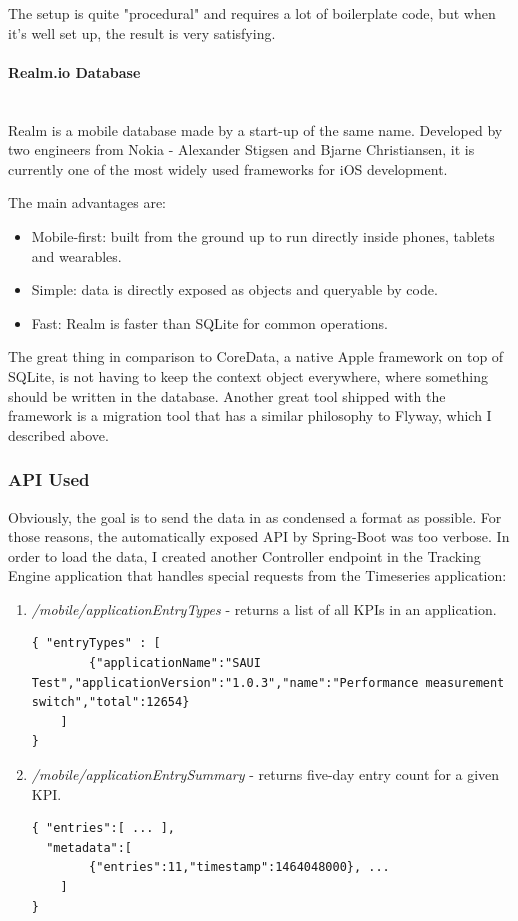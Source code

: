 The setup is quite "procedural" and requires a lot of boilerplate code, but when it's well set up, the result is very satisfying.

\newpage

\paragraph{Realm.io Database}\mbox{}\\

Realm is a mobile database made by a start-up of the same name. Developed by two engineers from Nokia - Alexander Stigsen and Bjarne Christiansen, it is currently one of the most widely used frameworks for iOS development. 

The main advantages are:

\begin{itemize}
	\item Mobile-first: built from the ground up to run directly inside phones, tablets and wearables.
	\item Simple: data is directly exposed as objects and queryable by code.
	\item Fast: Realm is faster than SQLite for common operations.
\end{itemize}

The great thing in comparison to CoreData, a native Apple framework on top of SQLite, is not having to keep the context object everywhere, where something should be written in the database. Another great tool shipped with the framework is a migration tool that has a similar philosophy to Flyway, which I described above.

\subsubsection{API Used}

Obviously, the goal is to send the data in as condensed a format as possible. For those reasons, the automatically exposed API by Spring-Boot was too verbose. In order to load the data, I created another Controller endpoint in the Tracking Engine application that handles special requests from the Timeseries application:

\begin{enumerate}
	\item \emph{/mobile/applicationEntryTypes} - returns a list of all KPIs in an application.
	
\begin{lstlisting}
{ "entryTypes" : [
		{"applicationName":"SAUI Test","applicationVersion":"1.0.3","name":"Performance measurement switch","total":12654}
	]
}	
\end{lstlisting}	
	
	\item \emph{/mobile/applicationEntrySummary} - returns five-day entry count for a given KPI.
	
\begin{lstlisting}
{ "entries":[ ... ],
  "metadata":[
		{"entries":11,"timestamp":1464048000}, ...
	]
}
\end{lstlisting}	
\end{enumerate}

